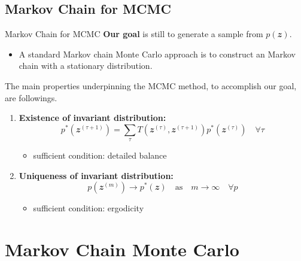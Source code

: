 \documentclass{bredelebeamer}
\begin{document}
\subsection{Markov Chain for MCMC}
\begin{frame}{Markov Chain for MCMC}
  \textbf{Our goal} is still to generate a sample from $p(\mathbfit{z})$.
  \begin{itemize}
    \item A standard Markov chain Monte Carlo approach is to construct
    an  Markov chain with a stationary distribution.
  \end{itemize}

  The main properties underpinning the MCMC method, to accomplish our goal,
  are followings.
  \begin{enumerate}
    \item \textbf{Existence of invariant distribution:}
    \begin{equation}
      p^{*}(\mathbfit{z}^{(\tau + 1)})
      = \sum_{\tau} T(\mathbfit{z}^{(\tau)}, \mathbfit{z}^{(\tau + 1)})
      p^{*}(\mathbfit{z}^{(\tau)})
      \quad \forall \tau
    \end{equation}
    \begin{itemize}
      \item sufficient condition: detailed balance
    \end{itemize}
    \item \textbf{Uniqueness of invariant distribution:}
    \begin{equation}
      p(\mathbfit{z}^{(m)}) \rightarrow p^{*}(\mathbfit{z})
      \quad \textrm{as} \quad
      m \rightarrow \infty \quad \forall p
    \end{equation}
    \begin{itemize}
      \item sufficient condition: ergodicity
    \end{itemize}
  \end{enumerate}
\end{frame}

\section{Markov Chain Monte Carlo}
\end{document}

